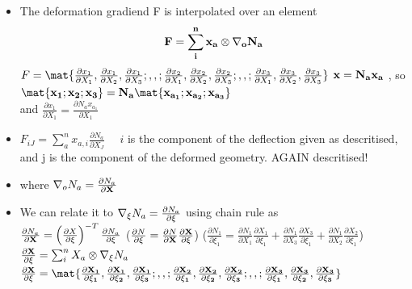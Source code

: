 	\begin{frame}
		\begin{itemize}
			\item  The deformation gradiend F is interpolated over an element
			\begin{equation}
			\mathbf{F = \sum_{i}^{n}x_a \otimes \nabla_o N_a}
			\end{equation}
			$F = \mat{\frac{\partial x_1}{\partial X_1},\frac{\partial x_1}{\partial X_2},\frac{\partial x_1}{\partial X_3} ; , , ;
					  \frac{\partial x_2}{\partial X_1},\frac{\partial x_2}{\partial X_2},\frac{\partial x_2}{\partial X_3}; , , ;
				  	  \frac{\partial x_3}{\partial X_1},\frac{\partial x_3}{\partial X_2},\frac{\partial x_3}{\partial X_3}}$
			\qquad $\mathbf{x = N_ax_a}$ , so $\ve{\mat{x_1;x_2;x_3} = N_a\mat{x_{a_1};x_{a_2} ;x_{a_3} }}$ 			\\ and $\frac{\partial x_1}{\partial X_1} =  \frac{\partial N_a x_{a_1}}{\partial X_1}$
			\item $F_{iJ} = \sum_{a}^{n} x_{a,i} \frac{\partial N_a}{\partial X_J} \quad$ $i$ is the component of the deflection given as descritised, and j is the component of the deformed geometry. AGAIN descritised! 
			\item where $\nabla_o N_a = \frac{\partial N_a}{\partial \mathbf{X}}$ 
			\item We can relate it to $\nabla_{\xi} N_a = \frac{\partial N_a}{\partial \mathbf{\xi}}$ using chain rule as\\
			$\frac{\partial N_a}{\partial \mathbf{X}} = \left(\frac{\partial X}{\partial \mathbf{\xi}} \right)^{-T}\frac{\partial N_a}{\partial \mathbf{\xi}}$ \qquad ($\frac{\partial N}{\partial \xi} = \frac{\partial N}{\partial \mathbf{X}}\frac{\partial \mathbf{X}}{\partial \xi}$) \qquad ($\frac{\partial N_1}{\partial \xi_1} = \frac{\partial N_1}{\partial X_1}\frac{\partial X_1}{\partial \xi_1} + \frac{\partial N_1}{\partial X_3}\frac{\partial X_3}{\partial \xi_1}+ \frac{\partial N_1}{\partial X_2}\frac{\partial X_2}{\partial \xi_1}$) \\ 
			$\frac{\partial \mathbf{X}}{\partial \mathbf{\xi}} =  \sum_{i}^{n}X_a \otimes \nabla_{\xi} N_a$ 
			\qquad  \qquad 
			$\ve{\frac{\partial X}{\partial \xi} = \mat{\frac{\partial X_1}{\partial \xi_1},\frac{\partial X_1}{\partial \xi_2},\frac{\partial X_1}{\partial \xi_3} ; , , ;
			\frac{\partial X_2}{\partial \xi_1},\frac{\partial X_2}{\partial \xi_2},\frac{\partial X_2}{\partial \xi_3}; , , ;
			\frac{\partial X_3}{\partial \xi_1},\frac{\partial X_3}{\partial \xi_2},\frac{\partial X_3}{\partial \xi_3}}}$

		\end{itemize}	\end{frame}
	
